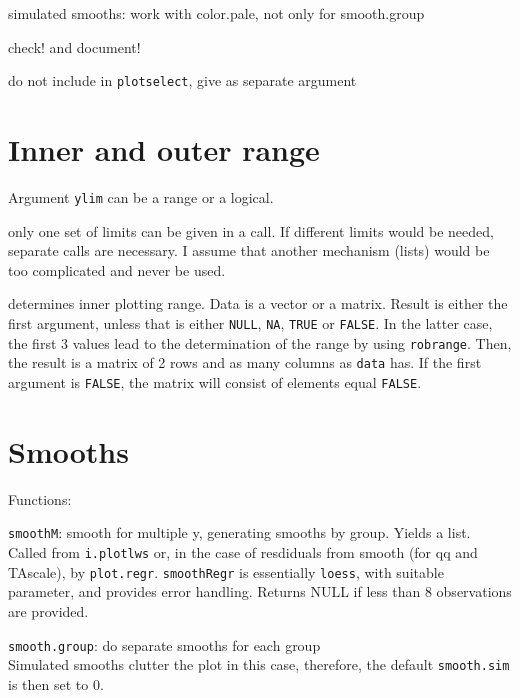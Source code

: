 \documentclass[11pt]{article}
\def\T{\texttt}
\def\code{\texttt}
\begin{document}
simulated smooths: work with color.pale, not only for smooth.group



check! and document!

do not include in \T{plotselect}, give as separate argument

\section{Inner and outer range}
Argument \T{ylim} can be a range or a logical.

only one set of limits can be given in a call.
If different limits would be needed, separate calls are necessary.
I assume that another mechanism (lists) would be too complicated
and never be used.

determines inner plotting range.
Data is a vector or a matrix.
Result is either the first argument, unless that is either 
\T{NULL}, \T{NA}, \T{TRUE} or \T{FALSE}. In the latter case,
the first 3 values lead to the determination of the range by using 
\T{robrange}.
Then, the result is a matrix of 2 rows and as many columns as \T{data} has.
If the first argument is \T{FALSE}, the matrix will consist of
elements equal \T{FALSE}.

\section{Smooths}
Functions:

\Itm
\code{smoothM}: smooth for multiple y, generating smooths by group. 
Yields a list.
Called from \code{i.plotlws} or, in the case of
resdiduals from smooth (for qq and TAscale), by \code{plot.regr}.
\Itm
\code{smoothRegr} is essentially \code{loess}, with suitable parameter, 
and provides error handling. 
Returns NULL if less than 8 observations are provided.


\code{smooth.group}: do separate smooths for each group\\
Simulated smooths clutter the plot in this case, therefore, the default
\code{smooth.sim} is then set to 0.
\end{document}
